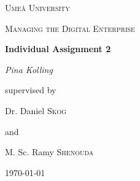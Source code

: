 \documentclass[a4]{scrartcl}
\begin{document}
	
	\begin{titlepage}
		\centering
		{\scshape\LARGE Umeå University \par}
		\vspace{1cm}
		{\scshape\Large Managing the Digital Enterprise \par }
		\vspace{1.5cm}
		{\huge\bfseries  {\color{BrickRed}Individual Assignment 2} \par}
		\vspace{2cm}
		{\Large\itshape Pina Kolling\par}
		\vfill
		supervised by \par 
		\vspace{1cm}
		Dr. Daniel \textsc{Skog} \par 
		and \par 
		M. Sc. Ramy \textsc{Shenouda} 
		
		\vfill
		
		{\large \today\par}
	\end{titlepage}
	
	\setcounter{page}{1}
	
	\begin{doublespace}
		\tableofcontents
	\end{doublespace}

	
	\newpage



\end{document}
